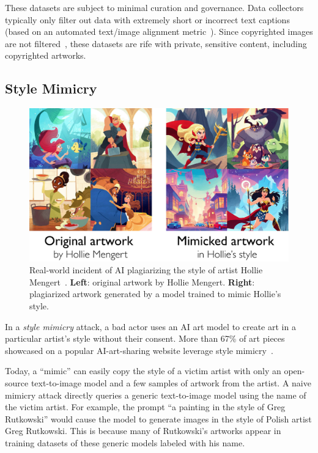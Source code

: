 These datasets are subject to minimal curation and governance. Data
collectors typically only filter out data with extremely short or incorrect text captions
(based on an automated text/image alignment metric~\cite{schuhmann2022laion}). %
Since copyrighted images are not filtered~\cite{schuhmann2022laion}, these
datasets are rife with private, sensitive content, including copyrighted
artworks.

\secspace
\subsection{Style Mimicry}
\label{sec:mimicry-back}

\begin{figure}[t]
  \centering
  \includegraphics[width=0.95\columnwidth]{plots/overview/hollie-mimic.pdf}
  \vspace{-0.1in}
  \caption{Real-world incident of AI plagiarizing the style of artist Hollie Mengert~\cite{hollie-steal}. {\bf Left}: original artwork by Hollie Mengert. {\bf Right}: plagiarized artwork generated by a model trained to mimic Hollie's style. }
  \label{fig:hollie-mimic}
\end{figure}

In a {\em style mimicry} attack, a bad actor uses an AI art model to create
art in a particular artist's style without their consent. %
More than 67\% of 
art pieces showcased on a popular AI-art-sharing website leverage style
mimicry~\cite{mid-top-artistname}.

 Today, a ``mimic'' can easily copy the style of
a victim artist with only an open-source text-to-image model and a few
samples of artwork from the artist. A naive mimicry attack directly queries a
generic text-to-image model using the name of the victim artist. For example,
the prompt ``a painting in the style of Greg Rutkowski'' would cause the
model to generate images in the style of Polish artist Greg Rutkowski. This
is because many of Rutkowski's artworks appear in training datasets of these
generic models labeled with his name.

